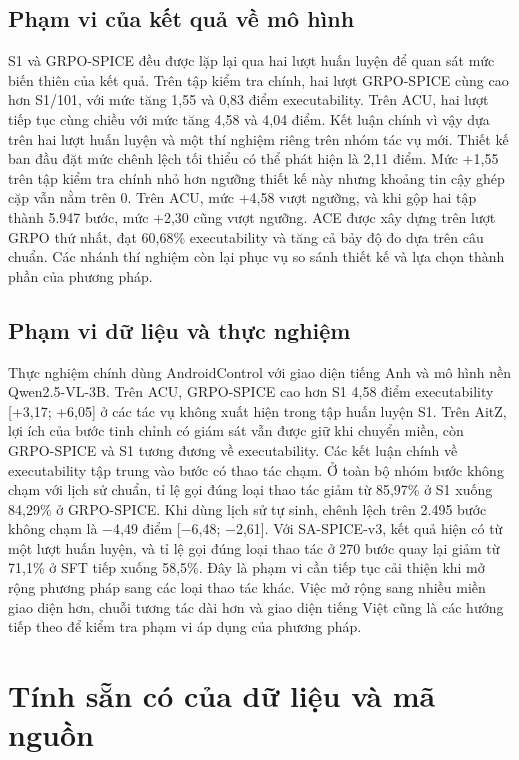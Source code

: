 \subsection{Phạm vi của kết quả về mô hình}\label{sec:7.2.2}

S1 và GRPO-SPICE đều được lặp lại qua hai lượt huấn luyện để quan sát mức biến thiên của kết quả. Trên tập kiểm tra chính, hai lượt GRPO-SPICE cùng cao hơn S1/101, với mức tăng 1,55 và 0,83 điểm executability. Trên ACU, hai lượt tiếp tục cùng chiều với mức tăng 4,58 và 4,04 điểm. Kết luận chính vì vậy dựa trên hai lượt huấn luyện và một thí nghiệm riêng trên nhóm tác vụ mới. Thiết kế ban đầu đặt mức chênh lệch tối thiểu có thể phát hiện là 2,11 điểm. Mức +1,55 trên tập kiểm tra chính nhỏ hơn ngưỡng thiết kế này nhưng khoảng tin cậy ghép cặp vẫn nằm trên 0. Trên ACU, mức +4,58 vượt ngưỡng, và khi gộp hai tập thành 5.947 bước, mức +2,30 cũng vượt ngưỡng. ACE được xây dựng trên lượt GRPO thứ nhất, đạt 60,68\% executability và tăng cả bảy độ đo dựa trên câu chuẩn. Các nhánh thí nghiệm còn lại phục vụ so sánh thiết kế và lựa chọn thành phần của phương pháp.

\subsection{Phạm vi dữ liệu và thực nghiệm}\label{sec:7.2.3}

Thực nghiệm chính dùng AndroidControl với giao diện tiếng Anh và mô hình nền Qwen2.5-VL-3B. Trên ACU, GRPO-SPICE cao hơn S1 4,58 điểm executability [+3,17; +6,05] ở các tác vụ không xuất hiện trong tập huấn luyện S1. Trên AitZ, lợi ích của bước tinh chỉnh có giám sát vẫn được giữ khi chuyển miền, còn GRPO-SPICE và S1 tương đương về executability. Các kết luận chính về executability tập trung vào bước có thao tác chạm. Ở toàn bộ nhóm bước không chạm với lịch sử chuẩn, tỉ lệ gọi đúng loại thao tác giảm từ 85,97\% ở S1 xuống 84,29\% ở GRPO-SPICE. Khi dùng lịch sử tự sinh, chênh lệch trên 2.495 bước không chạm là $-$4,49 điểm [$-$6,48; $-$2,61]. Với SA-SPICE-v3, kết quả hiện có từ một lượt huấn luyện, và tỉ lệ gọi đúng loại thao tác ở 270 bước quay lại giảm từ 71,1\% ở SFT tiếp xuống 58,5\%. Đây là phạm vi cần tiếp tục cải thiện khi mở rộng phương pháp sang các loại thao tác khác. Việc mở rộng sang nhiều miền giao diện hơn, chuỗi tương tác dài hơn và giao diện tiếng Việt cũng là các hướng tiếp theo để kiểm tra phạm vi áp dụng của phương pháp.

\section{Tính sẵn có của dữ liệu và mã nguồn}\label{sec:7.3}

